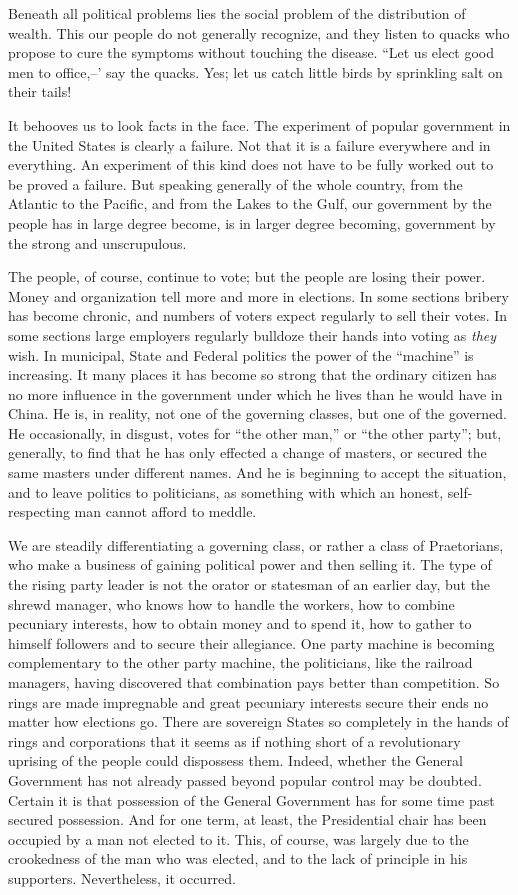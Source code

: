 \documentclass{book}
\begin{document}
Beneath all political problems lies the social problem of the distribution of wealth. This our people do not generally recognize, and they listen to quacks who propose to cure the symptoms without touching the disease. “Let us elect good men to office,–’ say the quacks. Yes; let us catch little birds by sprinkling salt on their tails!

It behooves us to look facts in the face. The experiment of popular government in the United States is clearly a failure. Not that it is a failure everywhere and in everything. An experiment of this kind does not have to be fully worked out to be proved a failure. But speaking generally of the whole country, from the Atlantic to the Pacific, and from the Lakes to the Gulf, our government by the people has in large degree become, is in larger degree becoming, government by the strong and unscrupulous.

The people, of course, continue to vote; but the people are losing their power. Money and organization tell more and more in elections. In some sections bribery has become chronic, and numbers of voters expect regularly to sell their votes. In some sections large employers regularly bulldoze their hands into voting as \emph{they} wish. In municipal, State and Federal politics the power of the “machine” is increasing. It many places it has become so strong that the ordinary citizen has no more influence in the government under which he lives than he would have in China. He is, in reality, not one of the governing classes, but one of the governed. He occasionally, in disgust, votes for “the other man,” or “the other party”; but, generally, to find that he has only effected a change of masters, or secured the same masters under different names. And he is beginning to accept the situation, and to leave politics to politicians, as something with which an honest, self-respecting man cannot afford to meddle.

We are steadily differentiating a governing class, or rather a class of Praetorians, who make a business of gaining political power and then selling it. The type of the rising party leader is not the orator or statesman of an earlier day, but the shrewd manager, who knows how to handle the workers, how to combine pecuniary interests, how to obtain money and to spend it, how to gather to himself followers and to secure their allegiance. One party machine is becoming complementary to the other party machine, the politicians, like the railroad managers, having discovered that combination pays better than competition. So rings are made impregnable and great pecuniary interests secure their ends no matter how elections go. There are sovereign States so completely in the hands of rings and corporations that it seems as if nothing short of a revolutionary uprising of the people could dispossess them. Indeed, whether the General Government has not already passed beyond popular control may be doubted. Certain it is that possession of the General Government has for some time past secured possession. And for one term, at least, the Presidential chair has been occupied by a man not elected to it. This, of course, was largely due to the crookedness of the man who was elected, and to the lack of principle in his supporters. Nevertheless, it occurred.
\end{document}
